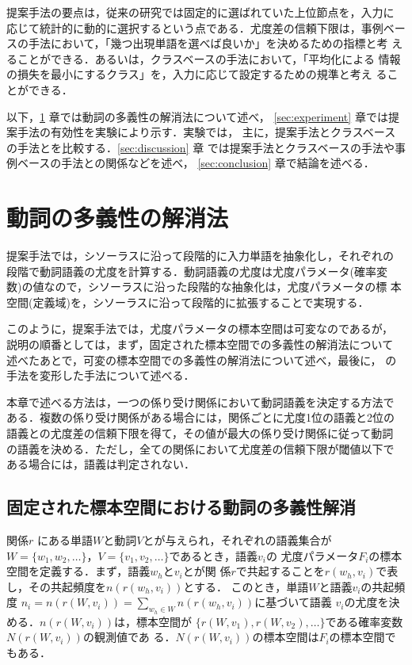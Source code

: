 提案手法の要点は，従来の研究では固定的に選ばれていた上位節点を，入力に
応じて統計的に動的に選択するという点である．尤度差の信頼下限は，事例ベー
スの手法において，「幾つ出現単語を選べば良いか」を決めるための指標と考
えることができる．あるいは，クラスベースの手法において，「平均化による
情報の損失を最小にするクラス」を，入力に応じて設定するための規準と考え
ることができる．

以下，\ref{sec:model} 章では動詞の多義性の解消法について述べ，
\ref{sec:experiment} 章では提案手法の有効性を実験により示す．実験では，
主に，提案手法とクラスベースの手法とを比較する．\ref{sec:discussion} 章
では提案手法とクラスベースの手法や事例ベースの手法との関係などを述べ，
\ref{sec:conclusion} 章で結論を述べる．

\section{動詞の多義性の解消法}
\label{sec:model}

提案手法では，シソーラスに沿って段階的に入力単語を抽象化し，それぞれの
段階で動詞語義の尤度を計算する．動詞語義の尤度は尤度パラメータ(確率変
数)の値なので，シソーラスに沿った段階的な抽象化は，尤度パラメータの標
本空間(定義域)を，シソーラスに沿って段階的に拡張することで実現する．

このように，提案手法では，尤度パラメータの標本空間は可変なのであるが，
説明の順番としては，まず，固定された標本空間での多義性の解消法について
述べたあとで，可変の標本空間での多義性の解消法について述べ，最後に，
\cite{Dagan94}の手法を変形した手法について述べる．

本章で述べる方法は，一つの係り受け関係において動詞語義を決定する方法で
ある．複数の係り受け関係がある場合には，関係ごとに尤度1位の語義と2位の
語義との尤度差の信頼下限を得て，その値が最大の係り受け関係に従って動詞
の語義を決める．ただし，全ての関係において尤度差の信頼下限が閾値以下で
ある場合には，語義は判定されない．

\subsection{固定された標本空間における動詞の多義性解消}
\label{sec:solid}

関係$r$ にある単語$W$と動詞$V$とが与えられ，それぞれの語義集合が
$W=\{w_1,w_2,\ldots\}$，$V=\{v_1,v_2,\ldots\}$であるとき，語義$v_i$の
尤度パラメータ$F_i$の標本空間を定義する．まず，語義$w_h$と$v_i$とが関
係$r$で共起することを$r(w_h,v_i)$で表し，その共起頻度を$n(r(w_h,v_i))$とする．
このとき，単語$W$と語義$v_i$の共起頻度
$n_i = n(r(W,v_i)) = \sum_{w_h \in W} n(r(w_h,v_i))$に基づいて語義
$v_i$の尤度を決める．$n(r(W,v_i))$は，標本空間が
$\{r(W,v_1),r(W,v_2),\ldots\}$である確率変数$N(r(W,v_i))$の観測値であ
る．$N(r(W,v_i))$の標本空間は$F_i$の標本空間でもある．

